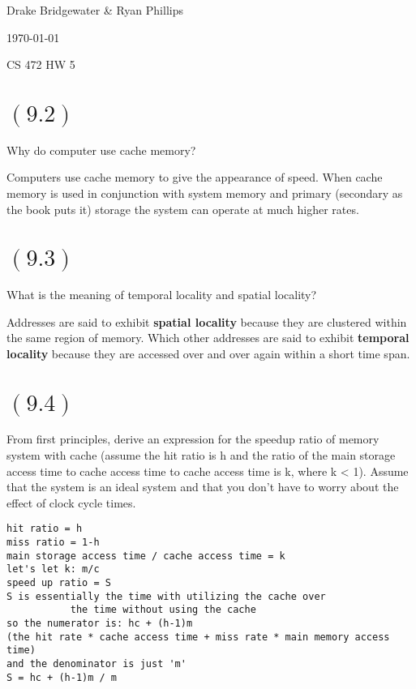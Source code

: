 \documentclass[letterpaper,12pt,titlepage]{article}
\def\name{Drake Bridgewater \& Ryan Phillips}
\begin{document}
\hfill \name

\hfill \today

\hfill CS 472 HW 5

\section*{$(9.2)$} Why do computer use cache memory?

\begin{mdframed}[style=MyFrame]
Computers use cache memory to give the appearance of speed. When cache memory is used in conjunction with system memory and primary (secondary as the book puts it) storage the system can operate at much higher rates. 
\end{mdframed}

\section*{$(9.3)$} What is the meaning of temporal locality and spatial locality?

\begin{mdframed}[style=MyFrame]
Addresses are said to exhibit \textbf{spatial locality} because they are clustered within the same region of memory. Which other addresses are said to exhibit \textbf{temporal locality} because they are accessed over and over again within a short time span.
\end{mdframed}

\vspace{-0.2cm}
\section*{$(9.4)$} From first principles, derive an expression for the speedup ratio of memory system with cache (assume the hit ratio is h and the ratio of the main storage access time to cache access time to cache access time is k, where k < 1). Assume that the system is an ideal system and that you don't have to worry about the effect of clock cycle times.
\begin{mdframed}[style=MyFrame]
\begin{verbatim}
hit ratio = h
miss ratio = 1-h
main storage access time / cache access time = k
let's let k: m/c
speed up ratio = S
S is essentially the time with utilizing the cache over 
           the time without using the cache
so the numerator is: hc + (h-1)m 
(the hit rate * cache access time + miss rate * main memory access time)
and the denominator is just 'm'
S = hc + (h-1)m / m 
\end{verbatim}
\end{mdframed}
\end{document}

